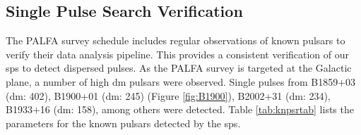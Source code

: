 \documentclass[a4paper,fleqn,usenatbib]{mnras}
\begin{document}

\subsection{Single Pulse Search Verification}
\label{sec:system_verify}

The PALFA survey schedule includes regular observations of known pulsars to
verify their data analysis pipeline. This provides a consistent verification of
our \gls{sps} to detect dispersed pulses. As the PALFA survey is targeted at the
Galactic plane, a number of high \gls{dm} pulsars were observed. Single pulses
from B1859+03 (\gls{dm}: 402), B1900+01 (\gls{dm}: 245) (Figure
\ref{fig:B1900}), B2002+31 (\gls{dm}: 234), B1933+16 (\gls{dm}: 158), among
others were detected. Table \ref{tab:knpsrtab} lists the parameters for the
known pulsars detected by the \gls{sps}.
\end{document}

